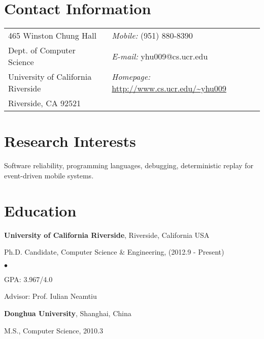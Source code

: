 \documentclass[margin,line]{res}
\newenvironment{list1}{
  \begin{list}{\ding{113}}{%
      \setlength{\itemsep}{0in}
      \setlength{\parsep}{0in} \setlength{\parskip}{0in}
      \setlength{\topsep}{0in} \setlength{\partopsep}{0in} 
      \setlength{\leftmargin}{0.17in}}}{\end{list}}
\newenvironment{list2}{
  \begin{list}{$\bullet$}{%
      \setlength{\itemsep}{0in}
      \setlength{\parsep}{0in} \setlength{\parskip}{0in}
      \setlength{\topsep}{0in} \setlength{\partopsep}{0in} 
      \setlength{\leftmargin}{0.2in}}}{\end{list}}
\begin{document}

\begin{resume}
\section{\sc Contact Information}
\vspace{.05in}
\begin{tabular}{@{}p{2in}p{4in}}
465 Winston Chung Hall              & {\it Mobile:}  (951) 880-8390 \\            
Dept. of Computer Science           & {\it E-mail:}  yhu009@cs.ucr.edu\\       
University of California Riverside  & {\it Homepage:} \url{http://www.cs.ucr.edu/~yhu009}\\
Riverside, CA 92521 
\end{tabular}


\section{\sc Research Interests}
Software reliability, programming languages, debugging, 
deterministic replay for event-driven mobile systems.


\section{\sc Education}
{\bf University of California Riverside}, Riverside, California USA\\
\vspace*{-.1in}
\begin{list1}
\item[] Ph.D. Candidate, Computer Science \& Engineering, (2012.9 - Present)
\begin{list2}
\vspace*{.05in}
\item GPA: 3.967/4.0
\item Advisor:  Prof. Iulian Neamtiu
\end{list2}
\end{list1}

{\bf Donghua University}, Shanghai, China\\
\vspace*{-.1in}
\begin{list1}
\item[] M.S., Computer Science,  2010.3
\end{list1}


\end{resume}
\end{document}
